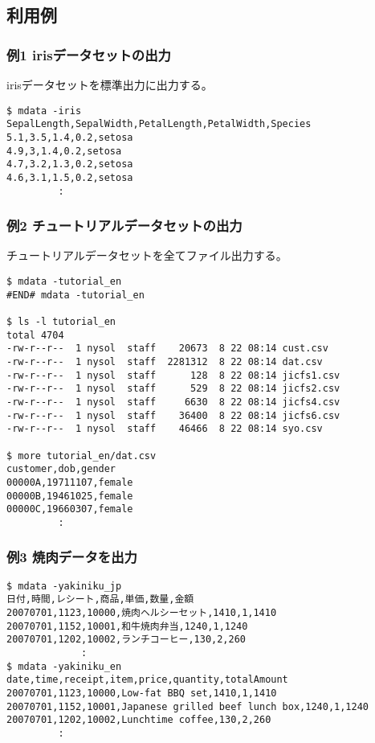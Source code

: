 \subsection*{利用例}
\subsubsection*{例1 irisデータセットの出力}
irisデータセットを標準出力に出力する。

\begin{Verbatim}[baselinestretch=0.7,frame=single,fontsize=\small]
$ mdata -iris
SepalLength,SepalWidth,PetalLength,PetalWidth,Species
5.1,3.5,1.4,0.2,setosa
4.9,3,1.4,0.2,setosa
4.7,3.2,1.3,0.2,setosa
4.6,3.1,1.5,0.2,setosa
         :
\end{Verbatim}

\subsubsection*{例2 チュートリアルデータセットの出力}
チュートリアルデータセットを全てファイル出力する。

\begin{Verbatim}[baselinestretch=0.7,frame=single,fontsize=\small]
$ mdata -tutorial_en
#END# mdata -tutorial_en

$ ls -l tutorial_en
total 4704
-rw-r--r--  1 nysol  staff    20673  8 22 08:14 cust.csv
-rw-r--r--  1 nysol  staff  2281312  8 22 08:14 dat.csv
-rw-r--r--  1 nysol  staff      128  8 22 08:14 jicfs1.csv
-rw-r--r--  1 nysol  staff      529  8 22 08:14 jicfs2.csv
-rw-r--r--  1 nysol  staff     6630  8 22 08:14 jicfs4.csv
-rw-r--r--  1 nysol  staff    36400  8 22 08:14 jicfs6.csv
-rw-r--r--  1 nysol  staff    46466  8 22 08:14 syo.csv

$ more tutorial_en/dat.csv
customer,dob,gender
00000A,19711107,female
00000B,19461025,female
00000C,19660307,female
         :
\end{Verbatim}

\subsubsection*{例3 焼肉データを出力}

\begin{Verbatim}[baselinestretch=0.7,frame=single,fontsize=\small]
$ mdata -yakiniku_jp
日付,時間,レシート,商品,単価,数量,金額
20070701,1123,10000,焼肉ヘルシーセット,1410,1,1410
20070701,1152,10001,和牛焼肉弁当,1240,1,1240
20070701,1202,10002,ランチコーヒー,130,2,260
             :
$ mdata -yakiniku_en
date,time,receipt,item,price,quantity,totalAmount
20070701,1123,10000,Low-fat BBQ set,1410,1,1410
20070701,1152,10001,Japanese grilled beef lunch box,1240,1,1240
20070701,1202,10002,Lunchtime coffee,130,2,260
         :
\end{Verbatim}

%
